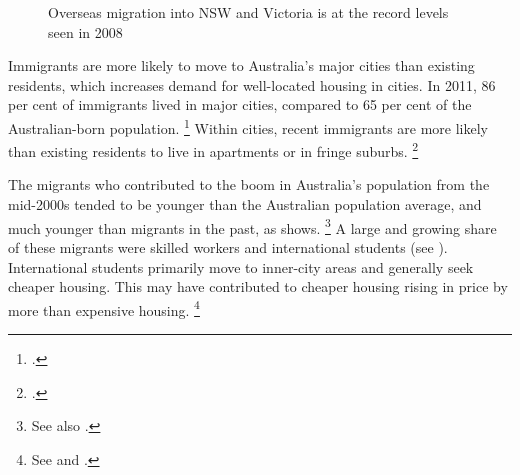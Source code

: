 \begin{figure}
\caption{Overseas migration into NSW and Victoria is at the record levels seen in 2008}\label{fig:NOM-states}
%
{\textcites{ABS-2017-AustDemographicstats}}
\end{figure}

Immigrants are more likely to move to Australia's major cities than existing residents, which increases demand for well-located housing in cities.
In 2011, 86 per cent of immigrants lived in major cities, compared to 65 per cent of the Australian-born population.%
    \footcites{CommissionMigrantIntake2016}[][24--25]{DaleyWoodChivers2017RegPatterns}
Within cities, recent immigrants are more likely than existing residents to live in apartments or in fringe suburbs.%
    \footcites[][12]{Birrellhousingaffordabilitycrisis}{SGS2017popgrowth}

The migrants who contributed to the boom in Australia's population from the mid-2000s tended to be younger than the Australian population average, and much younger than migrants in the past, as  shows.%
  \footnote{See also \textcite[][Graph~5]{Ellis2017Kellyspeech}.}
A large and growing share of these migrants were skilled workers and international students (see ).
International students primarily move to inner-city areas and generally seek cheaper housing.
This may have contributed to cheaper housing rising in price by more than expensive housing.%
    \footnote{See  and .}



